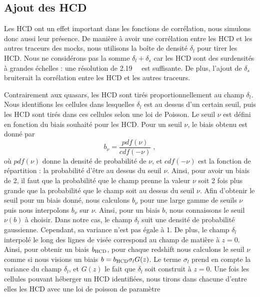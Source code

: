 \documentclass[11pt, twoside, a4paper, openright]{report}
\begin{document}
\subsection{Ajout des HCD}
\label{subsec:hcd}
Les HCD ont un effet important dans les fonctions de corrélation, nous simulons donc aussi leur présence. De manière à avoir une corrélation entre les HCD et les autres traceurs des mocks, nous utilisons la boîte de densité $\delta_l$ pour tirer les HCD. Nous ne considérons pas la somme $\delta_l + \delta_s$ car les HCD sont des surdensités à grandes échelles : une résolution de \SI{2.19}{\perh\Mpc} est suffisante. De plus, l'ajout de $\delta_s$ bruiterait la corrélation entre les HCD et les autres traceurs.

Contrairement aux quasars, les HCD sont tirés proportionnellement au champ $\delta_l$. Nous identifions les cellules dans lesquelles $\delta_l$ est au dessus d'un certain seuil, puis les HCD sont tirés dans ces cellules selon une loi de Poisson. Le seuil $\nu$ est défini en fonction du biais souhaité pour les HCD. Pour un seuil $\nu$, le biais obtenu est donné par
\begin{equation}
  b_{\nu} = \frac{pdf(\nu)}{cdf(-\nu)} \; ,
\end{equation}
où $pdf(\nu)$ donne la densité de probabilité de $\nu$, et $cdf(-\nu)$ est la fonction de répartition : la probabilité d'être au dessus du seuil $\nu$. Ainsi, pour avoir un biais de 2, il faut que la probabilité que le champ prenne la valeur $\nu$ soit 2 fois plus grande que la probabilité que le champ soit au dessus du seuil $\nu$. Afin d'obtenir le seuil pour un biais donné, nous calculons $b_{\nu}$ pour une large gamme de seuils $\nu$ puis nous interpolons $b_{\nu}$ sur $\nu$. Ainsi, pour un biais $b$, nous connaissons le seuil $\nu(b)$ à choisir.
Dans notre cas, le champ $\delta_l$ suit une densité de probabilité gaussienne. Cependant, sa variance n'est pas égale à 1. De plus, le champ $\delta_l$ interpolé le long des lignes de visée correspond au champ de matière à $z=0$. Ainsi, pour obtenir un biais $b_{\textsc{HCD}}$, pour chaque redshift nous  calculons le seuil $\nu$ comme si nous visions un biais $b = b_{\textsc{HCD}} \sigma_l G(z)$. Le terme $\sigma_l$ prend en compte la variance du champ $\delta_l$, et $G(z)$ le fait que $\delta_l$ soit construit à $z=0$.
Une fois les cellules pouvant héberger un HCD identifiées, nous tirons dans chacune d'entre elles les HCD avec une loi de poisson de paramètre
\end{document}
